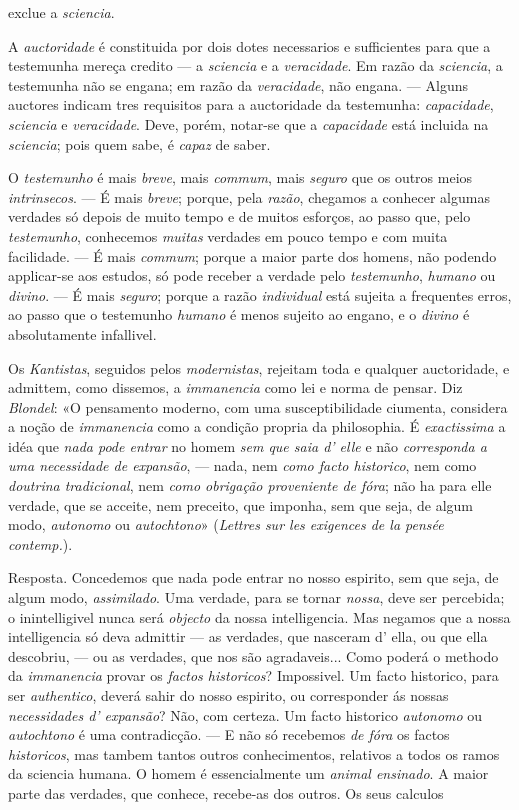 exclue a \emph{sciencia}.\par A \emph{auctoridade} é constituida por dois dotes necessarios e sufficientes para que a testemunha mereça credito --- a \emph{sciencia} e a \emph{veracidade}. Em razão da \emph{sciencia}, a testemunha não se engana; em razão da \emph{veracidade}, não engana. --- Alguns auctores indicam tres requisitos para a auctoridade da testemunha: \emph{capacidade}, \emph{sciencia} e \emph{veracidade}. Deve, porém, notar-se que a \emph{capacidade} está incluida na \emph{sciencia}; pois quem sabe, é \emph{capaz} de saber.\par O \emph{testemunho} é mais \emph{breve}, mais \emph{commum}, mais \emph{seguro} que os outros meios \emph{intrinsecos}. --- É mais \emph{breve}; porque, pela \emph{razão}, chegamos a conhecer algumas verdades só depois de muito tempo e de muitos esforços, ao passo que, pelo \emph{testemunho}, conhecemos \emph{muitas} verdades em pouco tempo e com muita facilidade. --- É mais \emph{commum}; porque a maior parte dos homens, não podendo applicar-se aos estudos, só pode receber a verdade pelo \emph{testemunho}, \emph{humano} ou \emph{divino}. --- É mais \emph{seguro}; porque a razão \emph{individual} está sujeita a frequentes erros, ao passo que o testemunho \emph{humano} é menos sujeito ao engano, e o \emph{divino} é absolutamente infallivel.\par Os \emph{Kantistas}, seguidos pelos \emph{modernistas}, rejeitam toda e qualquer auctoridade, e admittem, como dissemos, a \emph{immanencia} como lei e norma de pensar. Diz \emph{Blondel}: «O pensamento moderno, com uma susceptibilidade ciumenta, considera a noção de \emph{immanencia} como a condição propria da philosophia. É \emph{exactissima} a idéa que \emph{nada pode entrar} no homem \emph{sem que saia d' elle} e não \emph{corresponda a uma necessidade de expansão}, --- nada, nem \emph{como facto historico}, nem como \emph{doutrina tradicional}, nem \emph{como obrigação proveniente de fóra}; não ha para elle verdade, que se acceite, nem preceito, que imponha, sem que seja, de algum modo, \emph{autonomo} ou \emph{autochtono}» (\emph{Lettres sur les exigences de la pensée contemp.}).\par Resposta. Concedemos que nada pode entrar no nosso espirito, sem que seja, de algum modo, \emph{assimilado}. Uma verdade, para se tornar \emph{nossa}, deve ser percebida; o inintelligivel nunca será \emph{objecto} da nossa intelligencia. Mas negamos que a nossa intelligencia só deva admittir --- as verdades, que nasceram d' ella, ou que ella descobriu, --- ou as verdades, que nos são agradaveis... Como poderá o methodo da \emph{immanencia} provar os \emph{factos historicos}? Impossivel. Um facto historico, para ser \emph{authentico}, deverá sahir do nosso espirito, ou corresponder ás nossas \emph{necessidades d' expansão}? Não, com certeza. Um facto historico \emph{autonomo} ou \emph{autochtono} é uma contradicção. --- E não só recebemos \emph{de fóra} os factos \emph{historicos}, mas tambem tantos outros conhecimentos, relativos a todos os ramos da sciencia humana. O homem é essencialmente um \emph{animal ensinado}. A maior parte das verdades, que conhece, recebe-as dos outros. Os seus calculos 